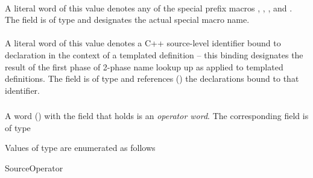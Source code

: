 \paragraph{}  
\label{sec:ifc:SourceLiteral:MsvcStringPrefixMacro}

A literal word of this value denotes any of the special prefix macros
, , , and .
The  field is of type  and designates the actual
special macro name.


\paragraph{}  
\label{sec:ifc:SourceLiteral:MsvcBinding}

A literal word of this value denotes a C++ source-level identifier bound to 
declaration in the context of a templated definition -- this binding designates
the result of the first phase of 2-phase name lookup up as applied to 
templated definitions.   The  field is of type 
and references () the declarations bound 
to that identifier.

\subsubsection{}
\label{sec:ifc:WordSort:Operator}


A word ()  with the  field that holds
 is an \emph{operator word}.  The corresponding 
 field is of type 

Values of type  are enumerated as follows
\begin{Enumeration}{SourceOperator}
\end{Enumeration}

